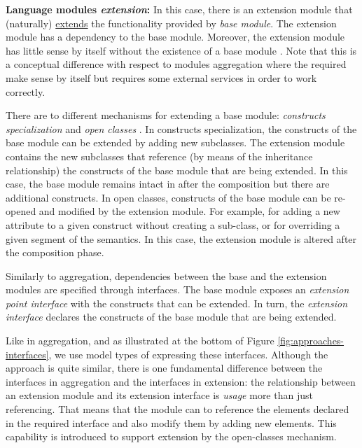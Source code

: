 \textbf{Language modules \textit{extension}:} In this case, there is an extension module that (naturally) \underline{extends} the functionality provided by \textit{base module}. The extension module has a dependency to the base module. Moreover, the extension module has little sense by itself without the existence of a base module \cite{Erdweg:2012}. Note that this is a conceptual difference with respect to modules aggregation where the required make sense by itself but requires some external services in order to work correctly.

There are to different mechanisms for extending a base module: \textit{constructs specialization} and \textit{open classes} \cite{Clifton:2000}. In constructs specialization, the constructs of the base module can be extended by adding new subclasses. The extension module contains the new subclasses that reference (by means of the inheritance relationship) the constructs of the base module that are being extended. In this case, the base module remains intact in after the composition but there are additional constructs. In open classes, constructs of the base module can be re-opened and modified by the extension module. For example, for adding a new attribute to a given construct without creating a sub-class, or for overriding a given segment of the semantics. In this case, the extension module is altered after the composition phase. 

Similarly to aggregation, dependencies between the base and the extension modules are specified through interfaces. The base module exposes an \textit{extension point interface} with the constructs that can be extended. In turn, the \textit{extension interface} declares the constructs of the base module that are being extended.

Like in aggregation, and as illustrated at the bottom of Figure \ref{fig:approaches-interfaces}, we use model types of expressing these interfaces. Although the approach is quite similar, there is one fundamental difference between the interfaces in aggregation and the interfaces in extension: the relationship between an extension module and its extension interface is \textit{usage} more than just referencing. That means that the module can to reference the elements declared in the required interface and also modify them by adding new elements. This capability is introduced to support extension by the open-classes mechanism.

